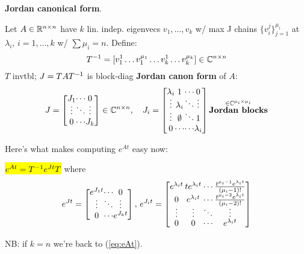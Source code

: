 \begin{Definition}
\textbf{Jordan canonical form}.

Let $A\in\mathbb R^{n\times n}$ have $k$ lin. indep. eigenvecs $v_1,\ldots,v_k$ w/ max J chains $\{v_i^j\}_{j=1}^{\mu_i}$ at $\lambda_i$, $i=1,\ldots,k$ w/ $\sum\mu_i=n$. Define:
\begin{equation*}
T^{-1}=[v_1^1\ldots v_1^{\mu_1}\ldots v_k^1\ldots v_k^{\mu_k}]\in\mathbb C^{n\times n}
\end{equation*}
$T$ invtbl; $J=TAT^{-1}$ is block-diag \textbf{Jordan canon form} of $A$:
\begin{equation*}
\def\arraycolsep{0pt}
J=\begin{bmatrix}
J_1 & \cdots & 0\vspace{-1mm} \\
\vdots & \ddots & \vdots\vspace{-0mm} \\
0 & \cdots & J_k
\end{bmatrix}\in\Complex^{n\times n},\quad
\def\arraycolsep{0pt}
J_i=\begin{bmatrix}
\lambda_i & 1 & \cdots & 0\vspace{-1mm} \\
\vdots & \lambda_i & \ddots & \vdots\vspace{-1mm} \\
\vdots & \emptyset & \ddots & 1 \\
0 & \cdots & \cdots & \lambda_i
\end{bmatrix}\overset{\in\Complex^{\mu_i\times\mu_i}}{
\textbf{Jordan blocks}
}
\end{equation*}
\end{Definition}
Here's what makes computing $e^{At}$ easy now:
\begin{Theorem}
\hl{$e^{At}=T^{-1}e^{Jt}T$} where
\vspace{-2.5mm}
\begin{equation*}
\def\arraycolsep{0pt}
e^{Jt}=\begin{bmatrix}
\e{J_1t} & \cdots & 0 \vspace{-1mm}\\
\vdots & \ddots & \vdots \\
0 & \cdots & \e{J_k t}
\end{bmatrix}\text{, }
\def\arraycolsep{1pt}
\e{J_i t}=\begin{bmatrix}
\e{\lambda_it} & t\e{\lambda_it} & \cdots & \frac{t^{\mu_i-1}\e{\lambda_it}}{(\mu_i-1)!} \\
0 & \e{\lambda_it} & \cdots & \frac{t^{\mu_i-2}\e{\lambda_it}}{(\mu_i-2)!}\vspace{-1mm} \\
\vdots & \vdots & \ddots & \vdots\vspace{-0.5mm} \\
0 & 0 & \cdots & \e{\lambda_it}
\end{bmatrix}
\end{equation*}
\vspace{-3mm}

NB: if $k=n$ we're back to (\ref{eq:eAt}).
\end{Theorem}
